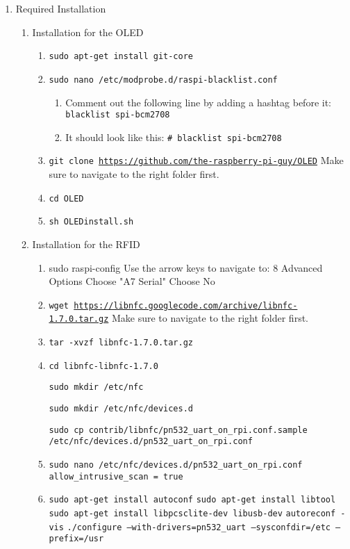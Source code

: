 \begin{enumerate}
\item Required Installation
    \begin{enumerate}[label*=\arabic*.]
        \item Installation for the OLED
            \begin{enumerate}[label*=\arabic*.]
                \item \texttt{sudo apt-get install git-core}
                \item \texttt{sudo nano /etc/modprobe.d/raspi-blacklist.conf}
                    \begin{enumerate}
                        \item Comment out the following line by adding a hashtag before it:
                            \texttt{blacklist spi-bcm2708}
                        \item It should look like this:
                            \texttt{\# blacklist spi-bcm2708}
                    \end{enumerate}
                \item \texttt{git clone \url{https://github.com/the-raspberry-pi-guy/OLED}}
                    Make sure to navigate to the right folder first.
                \item \texttt{cd OLED}
                \item \texttt{sh OLEDinstall.sh}
            \end{enumerate}
        \item Installation for the RFID
            \begin{enumerate}[label*=\arabic*.]
                \item sudo raspi-config
					Use the arrow keys to navigate to: 8 Advanced Options
					Choose "A7 Serial"
					Choose No
				\item \texttt{wget \url{https://libnfc.googlecode.com/archive/libnfc-1.7.0.tar.gz}}
				    Make sure to navigate to the right folder first.
				\item \texttt{tar -xvzf libnfc-1.7.0.tar.gz}
				\item \texttt{cd libnfc-libnfc-1.7.0}
				
				    \texttt{sudo mkdir /etc/nfc}
				    
				    \texttt{sudo mkdir /etc/nfc/devices.d}
				    
				    \texttt{sudo cp contrib/libnfc/pn532\_uart\_on\_rpi.conf.sample
				    /etc/nfc/devices.d/pn532\_uart\_on\_rpi.conf}
				    
				\item \texttt{sudo nano /etc/nfc/devices.d/pn532\_uart\_on\_rpi.conf}
				    \texttt{allow\_intrusive\_scan = true}
				\item \texttt{sudo apt-get install autoconf}
				    \texttt{sudo apt-get install libtool}
				    \texttt{sudo apt-get install libpcsclite-dev libusb-dev}
				    \texttt{autoreconf -vis}
				    \texttt{./configure --with-drivers=pn532\_uart --sysconfdir=/etc --prefix=/usr}
            \end{enumerate}
    \end{enumerate}
\end{enumerate}

